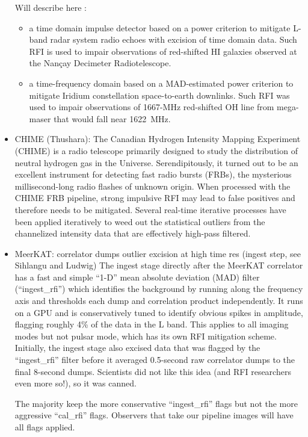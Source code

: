 \begin{itemize}
Will describe here :
\begin{itemize}
\item a time domain impulse detector based on a power criterion to mitigate L-band radar system radio echoes with excision of time domain data.  Such RFI is used to impair observations of red-shifted HI galaxies observed at the Nançay Decimeter Radiotelescope.
\item a time-frequency domain based on a MAD-estimated power criterion to mitigate Iridium constellation space-to-earth downlinks.  Such RFI was used to impair observations of 1667-MHz red-shifted OH line from mega-maser that would fall near 1622\ MHz.
\end{itemize}


\item CHIME (Thushara): The Canadian Hydrogen Intensity Mapping Experiment (CHIME) is a radio telescope primarily designed to study the distribution of neutral hydrogen gas in the Universe. Serendipitously, it turned out to be an excellent instrument for detecting fast radio bursts (FRBs), the mysterious millisecond-long radio flashes of unknown origin. When processed with the CHIME FRB pipeline, strong impulsive RFI may lead to false positives and therefore needs to be mitigated. Several real-time iterative processes have been applied iteratively to weed out the statistical outliers from the channelized intensity data that are effectively high-pass filtered.



\item MeerKAT: correlator dumps outlier excision at high time res (ingest step, see Sihlangu and Ludwig)
The ingest stage directly after the MeerKAT correlator has a fast and simple “1-D” mean absolute deviation (MAD) filter (“ingest\_rfi”) which identifies the background by running along the frequency axis and thresholds each dump and correlation product independently. It runs on a GPU and is conservatively tuned to identify obvious spikes in amplitude, flagging roughly 4\% of the data in the L band. This applies to all imaging modes but not pulsar mode, which has its own RFI mitigation scheme.
Initially, the ingest stage also excised data that was flagged by the “ingest\_rfi” filter before it averaged 0.5-second raw correlator dumps to the final 8-second dumps. Scientists did not like this idea (and RFI researchers even more so!), so it was canned.

The majority keep the more conservative “ingest\_rfi” flags but not the more aggressive “cal\_rfi” flags. Observers that take our pipeline images will have all flags applied.


\end{itemize}

